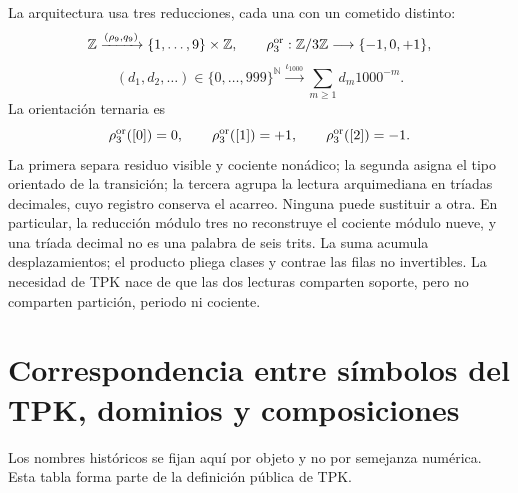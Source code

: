 La arquitectura usa tres reducciones, cada una con un cometido distinto:
\[
 \mathbb Z\xrightarrow{(\rho_9,q_9)}
 \{1,\ldots,9\}\times\mathbb Z,
 \qquad
 \rho_3^{\rm or}:\mathbb Z/3\mathbb Z\longrightarrow
 \{-1,0,+1\},
\]
\[
 (d_1,d_2,\ldots)\in\{0,\ldots,999\}^{\mathbb N}
 \xrightarrow{\iota_{1000}}
 \sum_{m\geq1}d_m1000^{-m}.
\]
La orientaci\'on ternaria es
\[
 \rho_3^{\rm or}([0])=0,\qquad
 \rho_3^{\rm or}([1])=+1,\qquad
 \rho_3^{\rm or}([2])=-1.
\]
La primera separa residuo visible y cociente non\'adico; la segunda asigna el
tipo orientado de la transici\'on; la tercera agrupa la lectura arquimediana
en tr\'iadas decimales, cuyo registro conserva el acarreo. Ninguna puede
sustituir a otra.
En particular, la reducci\'on m\'odulo tres no reconstruye el cociente m\'odulo
nueve, y una tr\'iada decimal no es una palabra de seis trits.
La suma acumula desplazamientos; el producto pliega clases y contrae las
filas no invertibles. La necesidad de TPK nace de que las dos lecturas
comparten soporte, pero no comparten partici\'on, periodo ni cociente.

\section{Correspondencia entre símbolos del TPK, dominios y composiciones}
\label{sec:diccionario-interno-tpk}

Los nombres históricos se fijan aquí por objeto y no por semejanza
numérica. Esta tabla forma parte de la definición pública de TPK.


